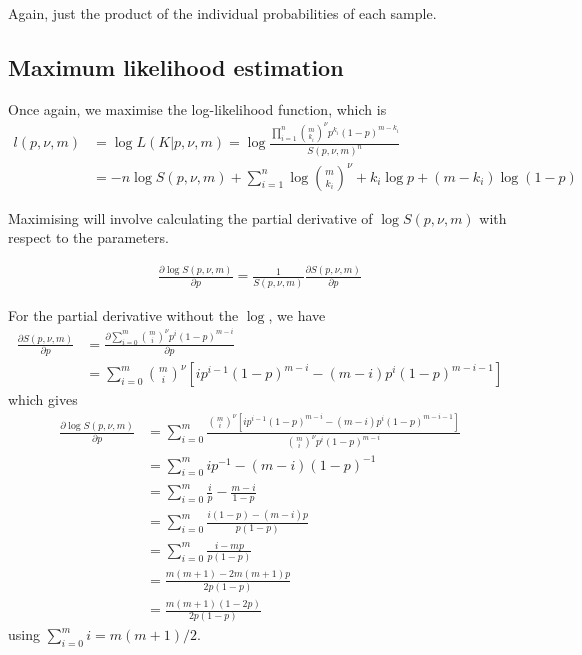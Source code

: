 \documentclass[a4paper,12pt]{article}
\theoremstyle{definition}
\newcommand{\pdiff}[2]{\frac{\partial #1}{\partial #2}} %
\begin{document}
Again, just the product of the individual probabilities of each sample.

\subsection{Maximum likelihood estimation}
Once again, we maximise the log-likelihood function, which is
\begin{align}
  l(p, \nu, m) &= \log L(K | p, \nu, m) = \log \frac{\prod_{i=1}^{n} \binom{m}{k_i}^{\nu} p^{k_i} (1-p)^{m-k_i}}{S(p, \nu, m)^n} \\
  &= - n \log S(p, \nu, m) + \sum_{i=1}^{n} \log \binom{m}{k_i}^{\nu} + k_i \log p + (m - k_i) \log (1-p)
\end{align}

Maximising will involve calculating the partial derivative of $\log S(p, \nu, m)$ with respect to the parameters. 

\begin{align}
  \pdiff{\log S(p, \nu, m)}{p} = \frac{1}{S(p, \nu, m)} \pdiff{S(p, \nu, m)}{p}
\end{align}

For the partial derivative without the $\log$, we have
\begin{align}
  \pdiff{S(p, \nu, m)}{p} &= \pdiff{\sum_{i=0}^m \binom{m}{i}^{\nu} p^i (1-p)^{m-i}}{p} \\
  & = \sum_{i=0}^m \binom{m}{i}^{\nu} \left[ i p^{i-1}(1-p)^{m-i} - (m-i)p^i(1-p)^{m-i-1} \right]
\end{align}
which gives
\begin{align}
  \pdiff{\log S(p, \nu, m)}{p} & = \sum_{i=0}^m \frac{\binom{m}{i}^{\nu} \left[ i p^{i-1}(1-p)^{m-i} - (m-i)p^i(1-p)^{m-i-1} \right]}{\binom{m}{i}^{\nu} p^{i} (1-p)^{m-i}} \\
  & = \sum_{i=0}^m i p^{-1} - (m-i) (1-p)^{-1} \\
  & = \sum_{i=0}^m \frac{i}{p} - \frac{m-i}{1-p} \\
  & = \sum_{i=0}^m \frac{i(1-p) - (m-i)p}{p(1-p)} \\
  & = \sum_{i=0}^m \frac{i - mp}{p(1-p)} \\
  & = \frac{m(m+1) -2m(m+1)p}{2p(1-p)} \\
  & = \frac{m(m+1)(1-2p)}{2p(1-p)}
\end{align}
using $\sum_{i=0}^{m} i = m(m+1)/2$.
\end{document}
